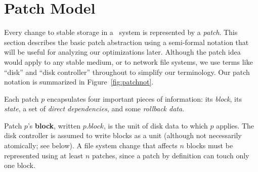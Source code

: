 
\section{Patch Model}
\label{sec:patch}

\makeatletter
\let\emptyset\varnothing
\newcommand{\PState}[1]{\ensuremath{#1.\textit{state}}}
\newcommand{\PBlock}[1]{\ensuremath{#1.\textit{block}}}
\newcommand{\PMemst}{\ensuremath{\textit{mem}}}
\newcommand{\PInfst}{\ensuremath{\textit{flight}}}
\newcommand{\PDiskst}{\ensuremath{\textit{disk}}}
\newcommand{\PSetlim}[1]{\def\@next{#1}\ifx\@next\@empty\else[\@next]\fi}
\newcommand{\PMem}[1][]{\ensuremath{\textit{Mem}\PSetlim{#1}}}
\newcommand{\PInf}[1][]{\ensuremath{\textit{Flight}\PSetlim{#1}}}
\newcommand{\PDisk}[1][]{\ensuremath{\textit{Disk}\PSetlim{#1}}}
\newcommand{\PHard}[1][]{\ensuremath{\textit{\Nrb}\PSetlim{#1}}}
\newcommand{\PSoft}[1][]{\ensuremath{\textit{\Rb}\PSetlim{#1}}}
\newcommand{\PEmpty}[1][]{\ensuremath{\textit{\Noop}\PSetlim{#1}}}
\newcommand{\PDDepset}[1]{\ensuremath{\def\@next{#1}\ifx\@next\@empty\else\@next.\fi\textit{ddeps}}}
\newcommand{\PDepend}{\ensuremath{\leadsto}}
\newcommand{\PDDepend}{\ensuremath{\rightarrow}}
\newcommand{\PDepset}[1]{\ensuremath{\textit{Dep}[#1]}}
\newcommand{\PRDepset}[1]{\ensuremath{\textit{RDep}[#1]}}
\makeatother

Every change to stable storage in a \Kudos\ system is represented by a
\emph{patch}.
%
This section describes the basic patch abstraction using a semi-formal
notation that will be useful for analyzing our optimizations later.
%
Although the patch idea would apply to any stable medium, or to network
file systems, we use terms like ``disk'' and ``disk controller'' throughout
to simplify our terminology.
%
Our patch notation is summarized in Figure~\ref{fig:patchnot}.

Each patch $p$ encapsulates four important pieces of information: its
 \emph{block}, its \emph{state}, a set of \emph{direct dependencies}, and
 some \emph{rollback data}.

Patch $p$'s \textbf{block}, written $\PBlock{p}$, is the unit of disk data
 to which $p$ applies.  The disk controller is assumed to write blocks as a
 unit (although not necessarily atomically; see below).  A file system
 change that affects $n$ blocks must be represented using at least $n$
 patches, since a patch by definition can touch only one block.

